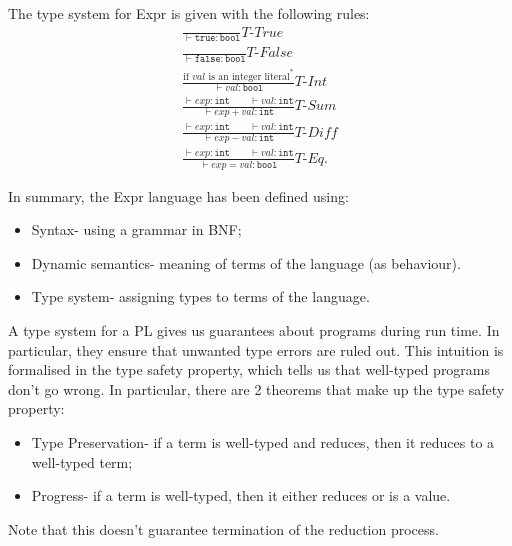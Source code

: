 \documentclass[a4paper, openany]{memoir}
\begin{document}
    The type system for Expr is given with the following rules:
    \begin{align*}
        \frac{}{\vdash \texttt{true} \colon \texttt{bool}} \textit{T-True} \\
        \frac{}{\vdash \texttt{false} \colon \texttt{bool}} \textit{T-False} \\
        \frac{\textrm{if } val \textrm{ is an integer literal}^*}{\vdash val \colon \texttt{bool}} \textit{T-Int} \\
        \frac{\vdash exp \colon \texttt{int} \qquad \vdash val \colon \texttt{int}}{\vdash exp + val \colon \texttt{int}} \textit{T-Sum} \\
        \frac{\vdash exp \colon \texttt{int} \qquad \vdash val \colon \texttt{int}}{\vdash exp - val \colon \texttt{int}} \textit{T-Diff} \\
        \frac{\vdash exp \colon \texttt{int} \qquad \vdash val \colon \texttt{int}}{\vdash exp = val \colon \texttt{bool}} \textit{T-Eq}.
    \end{align*}

    In summary, the Expr language has been defined using:
    \begin{itemize}
        \item Syntax- using a grammar in BNF;
        \item Dynamic semantics- meaning of terms of the language (as behaviour).
        \item Type system- assigning types to terms of the language.
    \end{itemize}

    A type system for a PL gives us guarantees about programs during run time. In particular, they ensure that unwanted type errors are ruled out. This intuition is formalised in the type safety property, which tells us that well-typed programs don't go wrong. In particular, there are 2 theorems that make up the type safety property:
    \begin{itemize}
        \item Type Preservation- if a term is well-typed and reduces, then it reduces to a well-typed term;
        \item Progress- if a term is well-typed, then it either reduces or is a value.
    \end{itemize}
    Note that this doesn't guarantee termination of the reduction process.
\end{document}
